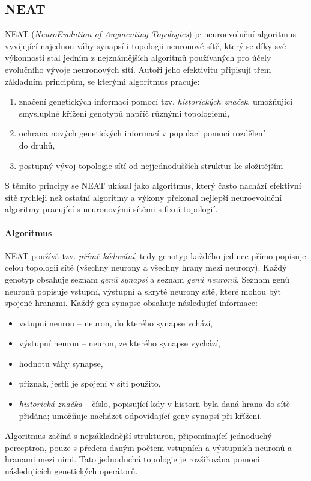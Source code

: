 \subsection{NEAT} \label{NN - NEAT}
NEAT (\emph{NeuroEvolution of Augmenting Topologies})
\citep{stanley2002evolving} je neuroevoluční algoritmus vyvíjející najednou
váhy synapsí i topologii neuronové sítě, který se díky své výkonnosti stal
jedním z nejznámějších algoritmů používaných pro účely evolučního vývoje
neuronových sítí. Autoři jeho efektivitu připisují třem základním principům, se
kterými algoritmus pracuje:
\begin{enumerate}
    \item značení genetických informací pomocí tzv. \emph{historických značek},
        umožňující smysluplné křížení genotypů napříč různými topologiemi,
   \item ochrana nových genetických informací v populaci pomocí rozdělení\\
       do druhů,
    \item postupný vývoj topologie sítí od nejjednodušších struktur ke
        složitějším
\end{enumerate}
S těmito principy se NEAT ukázal jako algoritmus, který často nachází efektivní
sítě rychleji než ostatní algoritmy a výkony překonal nejlepší neuroevoluční
algoritmy pracující s neuronovými sítěmi s fixní topologií.

\paragraph{Algoritmus}
NEAT používá tzv. \emph{přímé kódování}, tedy genotyp každého jedince přímo
popisuje celou topologii sítě (všechny neurony a všechny hrany mezi neurony).
Každý genotyp obsahuje seznam \emph{genů synapsí} a seznam \emph{genů neuronů}.
Seznam genů neuronů popisuje vstupní, výstupní a skryté neurony sítě, které
mohou být spojené hranami. Každý gen synapse obsahuje následující informace:
\begin{itemize}
    \item vstupní neuron -- neuron, do kterého synapse vchází,
    \item výstupní neuron -- neuron, ze kterého synapse vychází,
    \item hodnotu váhy synapse,
    \item příznak, jestli je spojení v síti použito,
    \item \emph{historická značka} -- číslo, popisující kdy v historii
        byla daná hrana do sítě přidána; umožňuje nacházet
        odpovídající geny synapsí při křížení.
\end{itemize}
Algoritmus začíná s nejzákladnější strukturou, připomínající jednoduchý
perceptron, pouze s předem daným počtem vstupních a výstupních neuronů a
hranami mezi nimi. Tato jednoduchá topologie je rozšiřována pomocí
následujících genetických operátorů.

